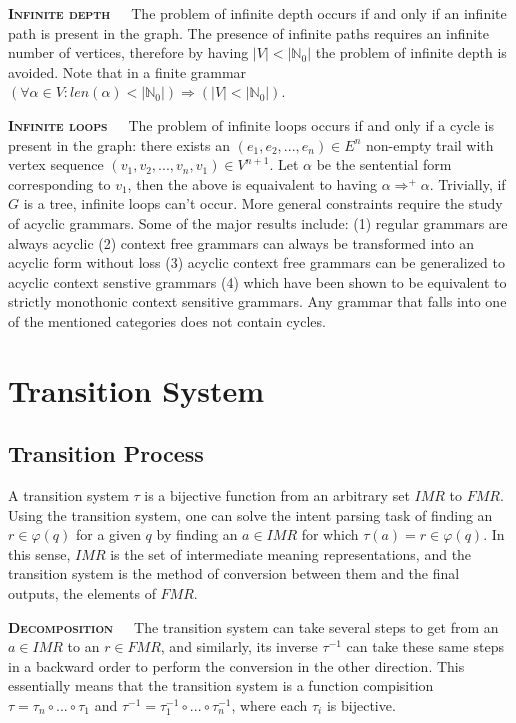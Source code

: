 \documentclass[12pt]{article}
\begin{document}
\textbf{\textsc{Infinite depth}}\ \ \ The problem of infinite depth occurs if and only if an infinite path is present in the graph. The presence of infinite paths requires an infinite number of vertices, therefore by having $|V| < |\mathbb{N}_{0}|$ the problem of infinite depth is avoided. Note that in a finite grammar $(\forall \alpha \in V : len(\alpha) < |\mathbb{N}_{0}|) \Rightarrow (|V| < |\mathbb{N}_{0}|)$.

\textbf{\textsc{Infinite loops}}\ \ \ The problem of infinite loops occurs if and only if a cycle is present in the graph: there exists an $(e_{1}, e_{2}, ..., e_{n}) \in E^{n}$ non-empty trail with vertex sequence $(v_{1}, v_{2}, ..., v_{n}, v_{1}) \in V^{n+1}$. Let $\alpha$ be the sentential form corresponding to $v_{1}$, then the above is equaivalent to having $\alpha \Rightarrow^{+} \alpha$. Trivially, if $G$ is a tree, infinite loops can't occur. More general constraints require the study of acyclic grammars. Some of the major results include: (1) regular grammars are always acyclic (2) context free grammars can always be transformed into an acyclic form without loss (3) acyclic context free grammars can be generalized to acyclic context senstive grammars (4) which have been shown to be equivalent to strictly monothonic context sensitive grammars. Any grammar that falls into one of the mentioned categories does not contain cycles.

\section{Transition System}

\subsection{Transition Process}

A transition system $\tau$ is a bijective function from an arbitrary set $IMR$ to $FMR$. Using the transition system, one can solve the intent parsing task of finding an $r \in \varphi(q)$ for a given $q$ by finding an $a \in IMR$ for which $\tau(a) = r \in \varphi(q)$. In this sense, $IMR$ is the set of intermediate meaning representations, and the transition system is the method of conversion between them and the final outputs, the elements of $FMR$.

\textbf{\textsc{Decomposition}}\ \ \ The transition system can take several steps to get from an $a \in IMR$ to an $r \in FMR$, and similarly, its inverse $\tau^{-1}$ can take these same steps in a backward order to perform the conversion in the other direction. This essentially means that the transition system is a function compisition $\tau = \tau_{n} \circ ... \circ \tau_{1}$ and $\tau^{-1} = \tau_{1}^{-1} \circ ... \circ \tau_{n}^{-1}$, where each $\tau_{i}$ is bijective.
\end{document}

